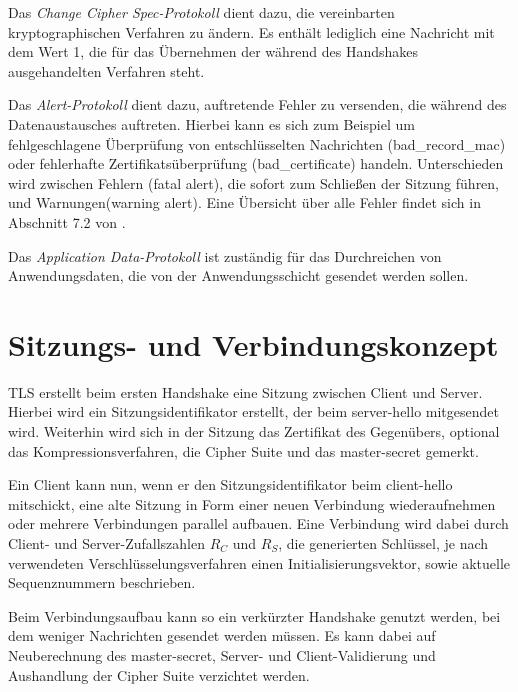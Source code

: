 \documentclass[
    12pt,
    headings=small,
    parskip=half,           %
    bibliography=totoc,
    numbers=noenddot,       %
    open=any,               %
    ]{scrreprt}
\newcommand{\mastersecret}		{master-secret}
\newcommand{\clienthello}			{client-hello}
\newcommand{\serverhello}			{server-hello}
\newcommand{\badrecordmac}		{bad\_record\_mac}
\newcommand{\badcertificate}		{bad\_certificate}
\begin{document}
Das \emph{Change Cipher Spec-Protokoll} dient dazu, die vereinbarten kryptographischen Verfahren zu ändern. Es enthält lediglich eine Nachricht mit dem Wert 1, die für das Übernehmen der während des Handshakes ausgehandelten Verfahren steht. 

Das \emph{Alert-Protokoll} dient dazu, auftretende Fehler zu versenden, die während des Datenaustausches auftreten. Hierbei kann es sich zum Beispiel um fehlgeschlagene Überprüfung von entschlüsselten Nachrichten (\badrecordmac{}) oder fehlerhafte Zertifikatsüberprüfung (\badcertificate{}) handeln. Unterschieden wird zwischen Fehlern (fatal alert), die sofort zum Schließen der Sitzung führen, und Warnungen(warning alert). Eine Übersicht über alle Fehler findet sich in Abschnitt 7.2 von \cite{tls12}.

Das \emph{Application Data-Protokoll} ist zuständig für das Durchreichen von Anwendungsdaten, die von der Anwendungsschicht gesendet werden sollen.

\section{Sitzungs- und Verbindungskonzept}

TLS erstellt beim ersten Handshake eine Sitzung zwischen Client und Server. Hierbei wird ein Sitzungsidentifikator erstellt, der beim \serverhello{} mitgesendet wird. Weiterhin wird sich in der Sitzung das Zertifikat des Gegenübers, optional das Kompressionsverfahren, die Cipher Suite und das \mastersecret{} gemerkt.

Ein Client kann nun, wenn er den Sitzungsidentifikator beim \clienthello{} mitschickt, eine alte Sitzung in Form einer neuen Verbindung wiederaufnehmen oder mehrere Verbindungen parallel aufbauen. Eine Verbindung wird dabei durch Client- und Server-Zufallszahlen \(R_C\) und \(R_S\), die generierten Schlüssel, je nach verwendeten Verschlüsselungsverfahren einen Initialisierungsvektor, sowie aktuelle Sequenznummern beschrieben.

Beim Verbindungsaufbau kann so ein verkürzter Handshake genutzt werden, bei dem weniger Nachrichten gesendet werden müssen. Es kann dabei auf Neuberechnung des \mastersecret{}, Server- und Client-Validierung und Aushandlung der Cipher Suite verzichtet werden.

\end{document}
